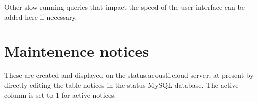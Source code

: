 \documentclass[
]{book}
\begin{document}
Other slow-running queries that impact the speed of the user interface can be added here if necessary.

\hypertarget{maintenence-notices}{%
\chapter{Maintenence notices}\label{maintenence-notices}}

These are created and displayed on the status.acousti.cloud server, at present by directly editing the table notices in the status MySQL database. The active column is set to 1 for active notices.

  
\end{document}
